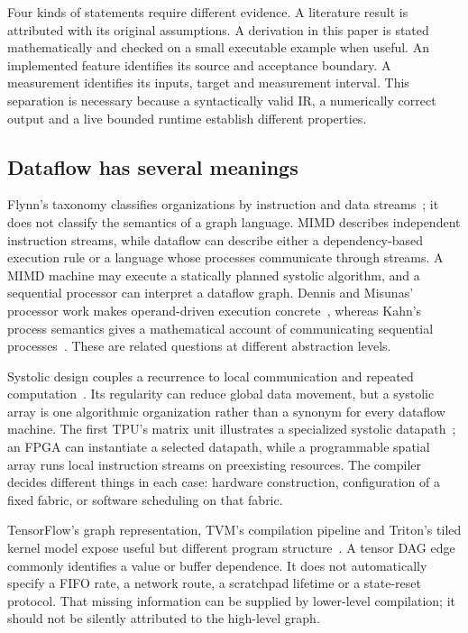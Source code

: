 \documentclass[final,3p,times,authoryear]{elsarticle}
\begin{document}
Four kinds of statements require different evidence. A literature result is attributed with its original assumptions. A derivation in this paper is stated mathematically and checked on a small executable example when useful. An implemented feature identifies its source and acceptance boundary. A measurement identifies its inputs, target and measurement interval. This separation is necessary because a syntactically valid IR, a numerically correct output and a live bounded runtime establish different properties.

\subsection{Dataflow has several meanings}
Flynn's taxonomy classifies organizations by instruction and data streams~\citep{flynn1972}; it does not classify the semantics of a graph language. MIMD describes independent instruction streams, while dataflow can describe either a dependency-based execution rule or a language whose processes communicate through streams. A MIMD machine may execute a statically planned systolic algorithm, and a sequential processor can interpret a dataflow graph. Dennis and Misunas' processor work makes operand-driven execution concrete~\citep{dennis1975}, whereas Kahn's process semantics gives a mathematical account of communicating sequential processes~\citep{kahn1974}. These are related questions at different abstraction levels.

Systolic design couples a recurrence to local communication and repeated computation~\citep{kung1982}. Its regularity can reduce global data movement, but a systolic array is one algorithmic organization rather than a synonym for every dataflow machine. The first TPU's matrix unit illustrates a specialized systolic datapath~\citep{jouppi2017}; an FPGA can instantiate a selected datapath, while a programmable spatial array runs local instruction streams on preexisting resources. The compiler decides different things in each case: hardware construction, configuration of a fixed fabric, or software scheduling on that fabric.

TensorFlow's graph representation, TVM's compilation pipeline and Triton's tiled kernel model expose useful but different program structure~\citep{abadi2016,chen2018tvm,tillet2019}. A tensor DAG edge commonly identifies a value or buffer dependence. It does not automatically specify a FIFO rate, a network route, a scratchpad lifetime or a state-reset protocol. That missing information can be supplied by lower-level compilation; it should not be silently attributed to the high-level graph.
\end{document}

